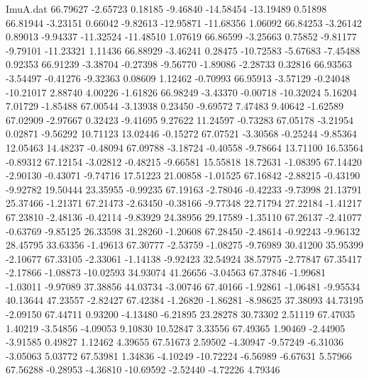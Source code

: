 \begin{filecontents}{ImuA.dat}
  66.79627   -2.65723    0.18185   -9.46840  -14.58454  -13.19489    0.51898
  66.81944   -3.23151    0.66042   -9.82613  -12.95871  -11.68356    1.06092
  66.84253   -3.26142    0.89013   -9.94337  -11.32524  -11.48510    1.07619
  66.86599   -3.25663    0.75852   -9.81177   -9.79101  -11.23321    1.11436
  66.88929   -3.46241    0.28475  -10.72583   -5.67683   -7.45488    0.92353
  66.91239   -3.38704   -0.27398   -9.56770   -1.89086   -2.28733    0.32816
  66.93563   -3.54497   -0.41276   -9.32363    0.08609    1.12462   -0.70993
  66.95913   -3.57129   -0.24048  -10.21017    2.88740    4.00226   -1.61826
  66.98249   -3.43370   -0.00718  -10.32024    5.16204    7.01729   -1.85488
  67.00544   -3.13938    0.23450   -9.69572    7.47483    9.40642   -1.62589
  67.02909   -2.97667    0.32423   -9.41695    9.27622   11.24597   -0.73283
  67.05178   -3.21954    0.02871   -9.56292   10.71123   13.02446   -0.15272
  67.07521   -3.30568   -0.25244   -9.85364   12.05463   14.48237   -0.48094
  67.09788   -3.18724   -0.40558   -9.78664   13.71100   16.53564   -0.89312
  67.12154   -3.02812   -0.48215   -9.66581   15.55818   18.72631   -1.08395
  67.14420   -2.90130   -0.43071   -9.74716   17.51223   21.00858   -1.01525
  67.16842   -2.88215   -0.43190   -9.92782   19.50444   23.35955   -0.99235
  67.19163   -2.78046   -0.42233   -9.73998   21.13791   25.37466   -1.21371
  67.21473   -2.63450   -0.38166   -9.77348   22.71794   27.22184   -1.41217
  67.23810   -2.48136   -0.42114   -9.83929   24.38956   29.17589   -1.35110
  67.26137   -2.41077   -0.63769   -9.85125   26.33598   31.28260   -1.20608
  67.28450   -2.48614   -0.92243   -9.96132   28.45795   33.63356   -1.49613
  67.30777   -2.53759   -1.08275   -9.76989   30.41200   35.95399   -2.10677
  67.33105   -2.33061   -1.14138   -9.92423   32.54924   38.57975   -2.77847
  67.35417   -2.17866   -1.08873  -10.02593   34.93074   41.26656   -3.04563
  67.37846   -1.99681   -1.03011   -9.97089   37.38856   44.03734   -3.00746
  67.40166   -1.92861   -1.06481   -9.95534   40.13644   47.23557   -2.82427
  67.42384   -1.26820   -1.86281   -8.98625   37.38093   44.73195   -2.09150
  67.44711    0.93200   -4.13480   -6.21895   23.28278   30.73302    2.51119
  67.47035    1.40219   -3.54856   -4.09053    9.10830   10.52847    3.33556
  67.49365    1.90469   -2.44905   -3.91585    0.49827    1.12462    4.39655
  67.51673    2.59502   -4.30947   -9.57249   -6.31036   -3.05063    5.03772
  67.53981    1.34836   -4.10249  -10.72224   -6.56989   -6.67631    5.57966
  67.56288   -0.28953   -4.36810  -10.69592   -2.52440   -4.72226    4.79346

\end{filecontents}
